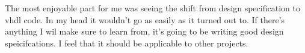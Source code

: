 The most enjoyable part for me was seeing the shift from design specification to vhdl code. In my head it wouldn't go as easily as it turned out to. If there's anything I wil make sure to learn from, it's going to be writing good design speicifcations. I feel that it should be applicable to other projects.